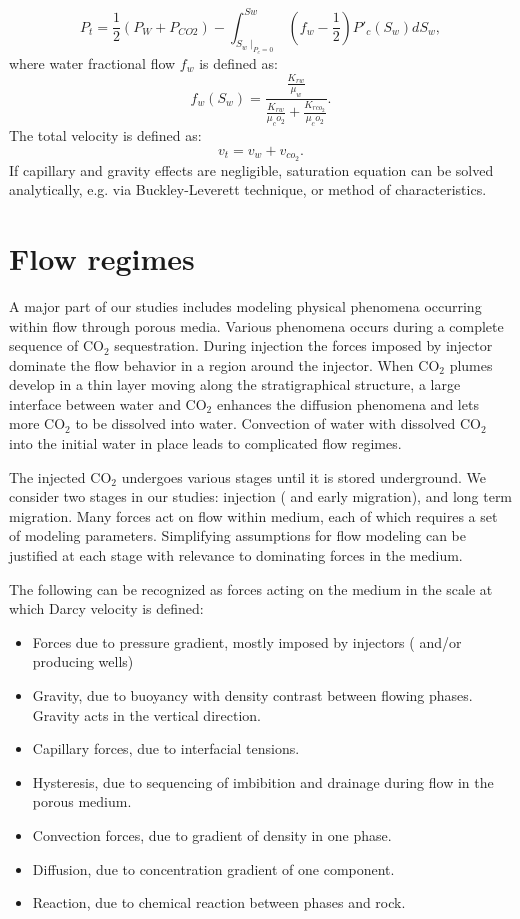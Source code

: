 \begin{equation}
 P_t=\frac{1}{2} (P_W+P_{CO2})-\int^{Sw}_{S_w
\mid_{P_c=0}}(f_w-\frac{1}{2}){P'}_c(S_w)dS_w,
 \label{eq:GP}
\end{equation} where water fractional flow $f_w$ is defined as:
\begin{equation}
 f_w(S_w)=\frac{\frac{K_{rw}}{\mu_w}}{\frac{K_{rw}}{\mu_co_2}+\frac{K_{rco_2}}{
\mu_co_2}}.
 \label{eq:fw}
\end{equation} The total velocity is defined as:
\begin{equation}
 v_t=v_w+v_{co_2}.
 \label{eq:VT}
\end{equation}If capillary and gravity effects are negligible, saturation
equation can be solved analytically, e.g. via Buckley-Leverett technique, or
method of characteristics.


\section{Flow regimes}
\label{sec:FlowRegimes}

A major part of our studies includes modeling physical phenomena occurring
within
flow through porous media. Various phenomena occurs during a complete sequence
of $\mbox{CO}_2$ sequestration. During injection the forces imposed by injector
dominate the flow behavior in a region around the injector. When $\mbox{CO}_2$
plumes develop in a thin layer moving along the stratigraphical structure, a
large interface between water and $\mbox{CO}_2$ enhances the diffusion phenomena
and lets more $\mbox{CO}_2$ to be dissolved into water. Convection of water with
dissolved $\mbox{CO}_2$ into the initial water in place leads to complicated
flow regimes.

The injected $\mbox{CO}_2$ undergoes various stages until it is stored
underground. We consider two stages in our studies: injection ( and early
migration), and long term migration. Many forces act on flow within medium, each
of which requires a set of modeling parameters. Simplifying assumptions for flow
modeling can be justified at each stage with relevance to dominating forces in
the medium.

The following can be recognized as forces acting on the medium in the scale at
which Darcy velocity is defined:

\begin{itemize}
\item Forces due to pressure gradient, mostly imposed by injectors ( and/or
producing wells)
\item Gravity, due to buoyancy with density contrast between flowing phases.
Gravity acts in the vertical direction.
\item Capillary forces, due to interfacial tensions.
\item Hysteresis, due to sequencing of imbibition and drainage during flow in
the porous medium.
\item Convection forces, due to gradient of density in one phase.
\item Diffusion, due to concentration gradient of one component.
\item Reaction, due to chemical reaction between phases and rock.
\end{itemize}

